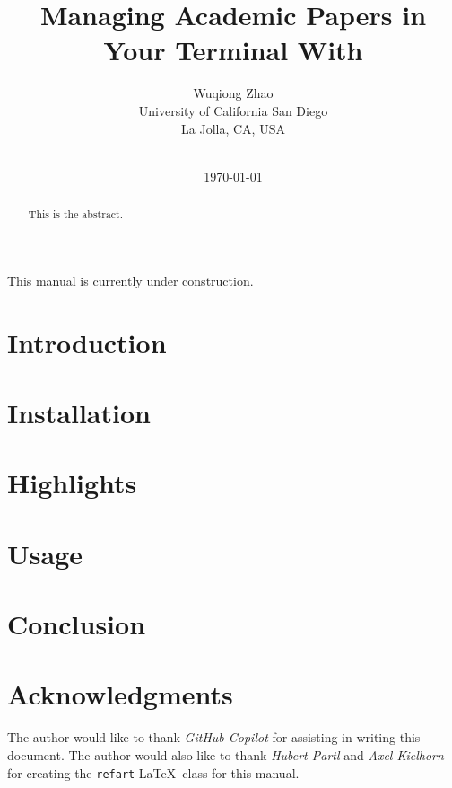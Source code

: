 \documentclass{refart}
\title{Managing Academic Papers in Your Terminal With \TermiPaper}
\author{Wuqiong Zhao\texorpdfstring{\\
  University of California San Diego\\
  La Jolla, CA, USA}{}}
\date{\TPversion\\\today}
\begin{document}
\maketitle

\begin{abstract}
  This is the abstract.
\end{abstract}

This manual is currently under construction.

\tableofcontents

\section{Introduction}\label{sec:introduction}


\section{Installation}\label{sec:installation}


\section{Highlights}\label{sec:highlights}


\section{Usage}\label{sec:usage}


\section{Conclusion}\label{sec:conclusion}


\section*{Acknowledgments}

The author would like to thank \textit{GitHub Copilot} for assisting in writing this document.
The author would also like to thank \textit{Hubert Partl} and \textit{Axel Kielhorn} for creating
the \texttt{refart} \LaTeX\ class for this manual.

{}


\end{document}
